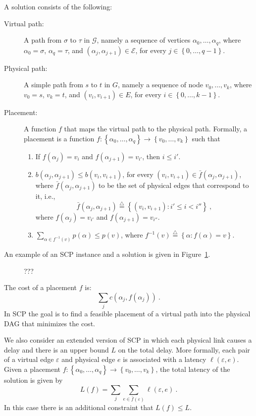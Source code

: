 \documentclass[runningheads]{llncs}
\newcommand{\eqdf}{\stackrel{\scriptscriptstyle \triangle}{=}}
\newcommand{\set}[1]{\left\{ #1 \right\}}
\newcommand{\eps}{\varepsilon}
\newcommand{\scp}{\textsc{SCP}\xspace}
\newcommand{\calE}{\mathcal{E}}
\newcommand{\calG}{\mathcal{G}}
\begin{document}
A solution consists of the following:
\begin{description}
\item[Virtual path:] A path from $\sigma$ to $\tau$ in $\calG$, namely
  a sequence of vertices $\alpha_0,\ldots,\alpha_q$, where
  $\alpha_0 = \sigma$, $\alpha_q = \tau$, and
  $(\alpha_j,\alpha_{j+1}) \in \calE$, for every $j \in
  \set{0,\ldots,q-1}$.

\item[Physical path:] A simple path from $s$ to $t$ in $G$, namely a
  sequence of node $v_0,\ldots,v_k$, where $v_0 = s$, $v_k = t$, and
  $(v_i,v_{i+1}) \in E$, for every $i \in \set{0,\ldots,k-1}$.
  
\item[Placement:] A function $f$ that maps the virtual path to the
  physical path.  Formally, a placement is a function $f:
  \set{\alpha_0,\ldots,\alpha_q} \to \set{v_0,\ldots,v_k}$
  such that
\begin{enumerate}
\item If $f(\alpha_j) = v_i$ and $f(\alpha_{j+1}) = v_{i'}$, then $i
  \leq i'$.
\item $b(\alpha_j,\alpha_{j+1}) \leq b(v_i,v_{i+1})$, for every
  $(v_i,v_{i+1}) \in \bar{f}(\alpha_j,\alpha_{j+1})$, where
  $\bar{f}(\alpha_j,\alpha_{j+1})$ to be the set of physical edges
  that correspond to it, i.e.,
\[
\bar{f}(\alpha_j,\alpha_{j+1}) \eqdf \set{(v_i,v_{i+1}) : i' \leq i < i''}
~,
\]
  where $f(\alpha_j) = v_{i'}$ and $f(\alpha_{j+1}) = v_{i''}$.

\item $\sum_{\alpha \in f^{-1}(v)} p(\alpha) \leq p(v)$, where
  $f^{-1}(v) \eqdf \set{\alpha : f(\alpha) = v}$.
 
\end{enumerate}
\end{description}

An example of an \scp instance and a solution is given in
Figure~\ref{fig:solution}.

\begin{figure}
\centering
\scalebox{1}{

}
\caption{???}
\label{fig:solution}
\end{figure}

The cost of a placement $f$ is:
\[
\sum_j c(\alpha_j,f(\alpha_j))
~.
\]
In \scp the goal is to find a feasible placement of a virtual path
into the physical DAG that minimizes the cost.


We also consider an extended version of \scp in which each physical
link causes a delay and there is an upper bound $L$ on the total
delay.  More formally, each pair of a virtual edge $\eps$ and physical
edge $e$ is associated with a latency $\ell(\eps,e)$.
%
Given a placement $f: \set{\alpha_0,\ldots,\alpha_q} \to
\set{v_0,\ldots,v_k}$, the total latency of the solution is given by
\[
L(f) = \sum_j \sum_{e \in \bar{f}(\eps)} \ell(\eps,e)
~.
\]
In this case there is an additional constraint that $L(f) \leq L$.
\end{document}
